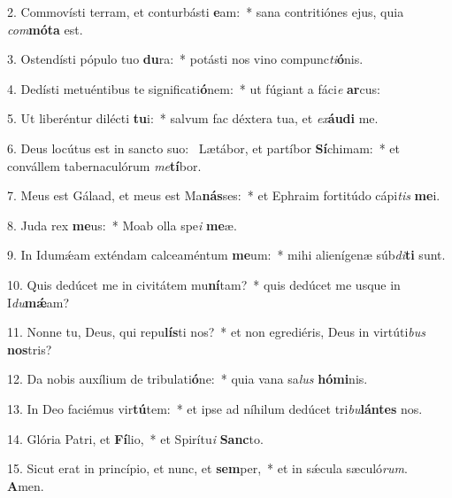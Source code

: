 2. Commovísti terram, et conturbásti \textbf{e}am:~*  sana contritiónes ejus, quia \textit{com}\textbf{mó}\textbf{ta} est.\

3. Ostendísti pópulo tuo \textbf{du}ra:~*  potásti nos vino compunc\textit{ti}\textbf{ó}nis.\

4. Dedísti metuéntibus te significati\textbf{ó}nem:~*  ut fúgiant a fáci\textit{e} \textbf{ar}cus:\

5. Ut liberéntur dilécti \textbf{tu}i:~*  salvum fac déxtera tua, et \textit{ex}\textbf{áu}\textbf{di} me.\

6. Deus locútus est in sancto suo: \dag\  Lætábor, et partíbor \textbf{Sí}chimam:~*  et convállem tabernaculórum \textit{me}\textbf{tí}bor.\

7. Meus est Gálaad, et meus est Ma\textbf{nás}ses:~*  et Ephraim fortitúdo cápi\textit{tis} \textbf{me}i.\

8. Juda rex \textbf{me}us:~*  Moab olla spe\textit{i} \textbf{me}æ.\

9. In Idumǽam exténdam calceaméntum \textbf{me}um:~*  mihi alienígenæ súb\textit{di}\textbf{ti} sunt.\

10. Quis dedúcet me in civitátem mu\textbf{ní}tam?~*  quis dedúcet me usque in I\textit{du}\textbf{mǽ}am?\

11. Nonne tu, Deus, qui repu\textbf{lís}ti nos?~*  et non egrediéris, Deus in virtúti\textit{bus} \textbf{nos}tris?\

12. Da nobis auxílium de tribulati\textbf{ó}ne:~*  quia vana sa\textit{lus} \textbf{hó}\textbf{mi}nis.\

13. In Deo faciémus vir\textbf{tú}tem:~*  et ipse ad níhilum dedúcet tri\textit{bu}\textbf{lán}\textbf{tes} nos.\

14. Glória Patri, et \textbf{Fí}lio,~*  et Spirítu\textit{i} \textbf{Sanc}to.\

15. Sicut erat in princípio, et nunc, et \textbf{sem}per,~*  et in sǽcula sæculó\textit{rum}. \textbf{A}men.\

